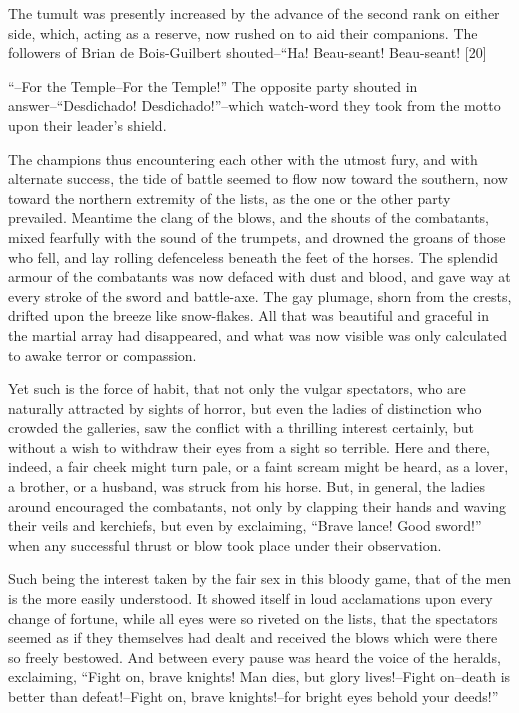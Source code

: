 The tumult was presently increased by the advance of the second rank on
either side, which, acting as a reserve, now rushed on to aid their
companions. The followers of Brian de Bois-Guilbert shouted--``Ha!
Beau-seant! Beau-seant! {[}20{]}

``--For the Temple--For the Temple!'' The opposite party shouted in
answer--``Desdichado! Desdichado!''--which watch-word they took from the
motto upon their leader's shield.

The champions thus encountering each other with the utmost fury, and
with alternate success, the tide of battle seemed to flow now toward the
southern, now toward the northern extremity of the lists, as the one or
the other party prevailed. Meantime the clang of the blows, and the
shouts of the combatants, mixed fearfully with the sound of the
trumpets, and drowned the groans of those who fell, and lay rolling
defenceless beneath the feet of the horses. The splendid armour of the
combatants was now defaced with dust and blood, and gave way at every
stroke of the sword and battle-axe. The gay plumage, shorn from the
crests, drifted upon the breeze like snow-flakes. All that was beautiful
and graceful in the martial array had disappeared, and what was now
visible was only calculated to awake terror or compassion.

Yet such is the force of habit, that not only the vulgar spectators, who
are naturally attracted by sights of horror, but even the ladies of
distinction who crowded the galleries, saw the conflict with a thrilling
interest certainly, but without a wish to withdraw their eyes from a
sight so terrible. Here and there, indeed, a fair cheek might turn pale,
or a faint scream might be heard, as a lover, a brother, or a husband,
was struck from his horse. But, in general, the ladies around encouraged
the combatants, not only by clapping their hands and waving their veils
and kerchiefs, but even by exclaiming, ``Brave lance! Good sword!'' when
any successful thrust or blow took place under their observation.

Such being the interest taken by the fair sex in this bloody game, that
of the men is the more easily understood. It showed itself in loud
acclamations upon every change of fortune, while all eyes were so
riveted on the lists, that the spectators seemed as if they themselves
had dealt and received the blows which were there so freely bestowed.
And between every pause was heard the voice of the heralds, exclaiming,
``Fight on, brave knights! Man dies, but glory lives!--Fight on--death
is better than defeat!--Fight on, brave knights!--for bright eyes behold
your deeds!''

